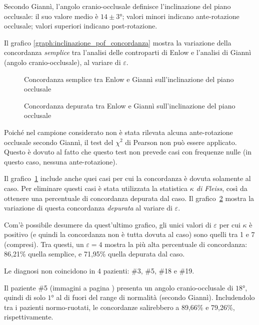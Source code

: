 Secondo Giannì, l'angolo cranio-occlusale definisce l'inclinazione del piano occlusale: il suo valore medio è $14 \pm 3°$; valori minori indicano ante-rotazione occlusale; valori superiori indicano post-rotazione.

Il grafico \vref{graph:inclinazione_pof_concordanza} mostra la variazione della concordanza \emph{semplice} tra l'analisi delle controparti di Enlow e l'analisi di Giannì (angolo cranio-occlusale), al variare di $\varepsilon$.

\begin{figure}[ht!]
\centering

\caption{Concordanza semplice tra Enlow e Giannì sull'inclinazione del piano occlusale}
\label{graph:inclinazione_pof_concordanza}
\end{figure}

\begin{figure}[ht!]
\centering

\caption{Concordanza depurata tra Enlow e Giannì sull'inclinazione del piano occlusale}
\label{graph:inclinazione_pof_kappa}
\end{figure}

Poiché nel campione considerato non è stata rilevata alcuna ante-rotazione occlusale secondo Giannì, il test del $\chi^2$ di Pearson non può essere applicato. Questo è dovuto al fatto che questo test non prevede casi con frequenze nulle (in questo caso, nessuna ante-rotazione).

Il grafico~\ref{graph:inclinazione_pof_concordanza} include anche quei casi per cui la concordanza è dovuta solamente al caso. Per eliminare questi casi è stata utilizzata la statistica \emph{$\kappa$ di Fleiss}, così da ottenere una percentuale di concordanza depurata dal caso. Il grafico~\ref{graph:inclinazione_pof_kappa} mostra la variazione di questa concordanza \emph{depurata} al variare di $\varepsilon$.

Com'è possibile desumere da quest'ultimo grafico, gli unici valori di $\varepsilon$ per cui $\kappa$ è positivo (e quindi la concordanza non è tutta dovuta al caso) sono quelli tra 1 e 7 (compresi). Tra questi, un $\varepsilon = 4$ mostra la più alta percentuale di concordanza: 86,21\% quella semplice, e 71,95\% quella depurata dal caso.

Le diagnosi non coincidono in $4$ pazienti: \#3, \#5, \#18 e \#19.

Il paziente \#5 (immagini a pagina \pageref{paz:EMALO2001}) presenta un angolo cranio-occlusale di $18°$, quindi di solo $1°$ al di fuori del range di normalità (secondo Giannì). Includendolo tra i pazienti normo-ruotati, le concordanze salirebbero a 89,66\% e 79,26\%, rispettivamente.

